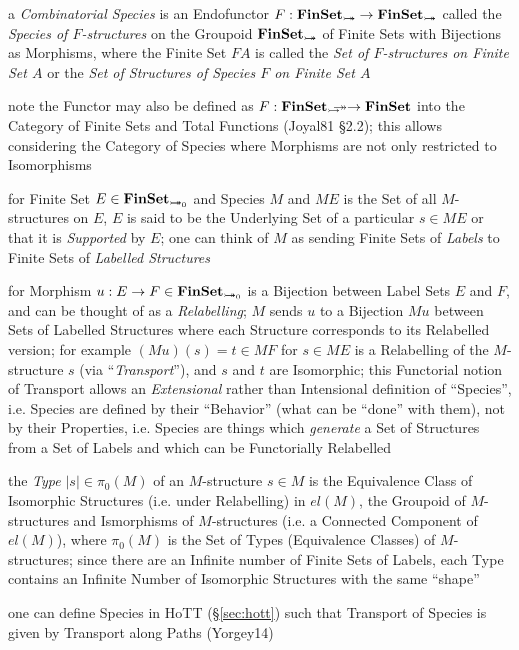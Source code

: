 a \emph{Combinatorial Species} is an Endofunctor $F : \mathbf{FinSet}_{\rightarrowtail\hspace{-8pt}\twoheadrightarrow}
\rightarrow \mathbf{FinSet}_{\rightarrowtail\hspace{-8pt}\twoheadrightarrow}$ called the \emph{Species of $F$-structures}
on the Groupoid $\mathbf{FinSet}_{\rightarrowtail\hspace{-8pt}\twoheadrightarrow}$ of Finite Sets with Bijections as
Morphisms, where the Finite Set $F A$ is called the \emph{Set of $F$-structures
  on Finite Set $A$} or the \emph{Set of Structures of Species $F$ on Finite Set
  $A$}

note the Functor may also be defined as $F : \mathbf{FinSet}_\rightarrowtail\hspace{-8pt}\twoheadrightarrow \rightarrow
\mathbf{FinSet}$ into the Category of Finite Sets and Total Functions (Joyal81
\S2.2); this allows considering the Category of Species where Morphisms are not
only restricted to Isomorphisms

for Finite Set $E \in \mathbf{FinSet}_{\rightarrowtail\hspace{-8pt}\twoheadrightarrow_0}$ and Species $M$ and $M E$ is the
Set of all $M$-structures on $E$, $E$ is said to be the Underlying Set of a
particular $s \in M E$ or that it is \emph{Supported} by $E$; one can think of
$M$ as sending Finite Sets of \emph{Labels} to Finite Sets of \emph{Labelled
  Structures}

for Morphism $u : E \rightarrow F \in \mathbf{FinSet}_{\rightarrowtail\hspace{-8pt}\twoheadrightarrow_0}$ is a Bijection
between Label Sets $E$ and $F$, and can be thought of as a \emph{Relabelling};
$M$ sends $u$ to a Bijection $M u$ between Sets of Labelled Structures where
each Structure corresponds to its Relabelled version; for example
$(M u)(s) = t \in M F$ for $s \in M E$ is a Relabelling of the $M$-structure
$s$ (via ``\emph{Transport}''), and $s$ and $t$ are Isomorphic; this Functorial
notion of Transport allows an \emph{Extensional} rather than Intensional
definition of ``Species'', i.e. Species are defined by their ``Behavior'' (what
can be ``done'' with them), not by their Properties, i.e. Species are things
which \emph{generate} a Set of Structures from a Set of Labels and which can be
Functorially Relabelled

the \emph{Type} $|s| \in \pi_0(M)$ of an $M$-structure $s \in M$ is the
Equivalence Class of Isomorphic Structures (i.e. under Relabelling) in $el(M)$,
the Groupoid of $M$-structures and Ismorphisms of $M$-structures (i.e. a
Connected Component of $el(M)$), where $\pi_0(M)$ is the Set of Types
(Equivalence Classes) of $M$-structures; since there are an Infinite number of
Finite Sets of Labels, each Type contains an Infinite Number of Isomorphic
Structures with the same ``shape''

one can define Species in HoTT (\S\ref{sec:hott}) such that Transport of Species
is given by Transport along Paths (Yorgey14)

